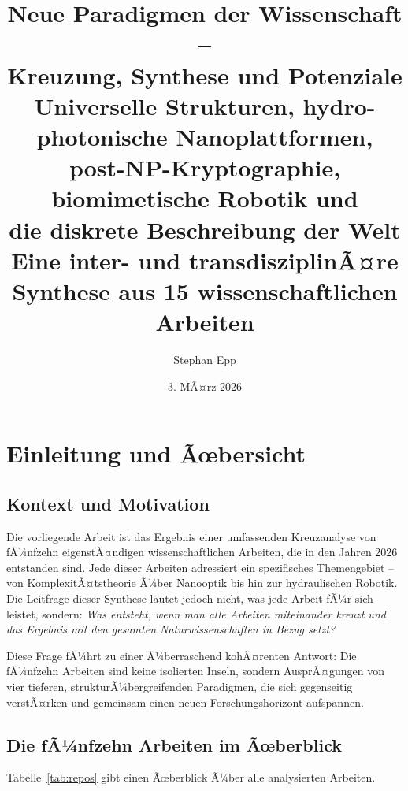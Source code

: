﻿\documentclass[a4paper,12pt]{scrreprt}
\title{%
  \textbf{Neue Paradigmen der Wissenschaft --}\\
  \textbf{Kreuzung, Synthese und Potenziale}\\[0.8em]
  \large Universelle Strukturen, hydro-photonische Nanoplattformen,\\
  post-NP-Kryptographie, biomimetische Robotik und\\
  die diskrete Beschreibung der Welt\\[1em]
  \normalsize Eine inter- und transdisziplinÃ¤re Synthese aus 15 wissenschaftlichen
  Arbeiten
}
\author{Stephan Epp}
\date{3. MÃ¤rz 2026}
\theoremstyle{definition}
\begin{document}
\maketitle
\newpage
\tableofcontents
\newpage

\section{Einleitung und Ãœbersicht}
\label{sec:einleitung}

\subsection{Kontext und Motivation}

Die vorliegende Arbeit ist das Ergebnis einer umfassenden Kreuzanalyse von
fÃ¼nfzehn eigenstÃ¤ndigen wissenschaftlichen Arbeiten, die in den Jahren
2026 entstanden sind. Jede dieser Arbeiten adressiert ein spezifisches
Themengebiet -- von KomplexitÃ¤tstheorie Ã¼ber Nanooptik bis hin zur
hydraulischen Robotik. Die Leitfrage dieser Synthese lautet jedoch nicht,
was jede Arbeit fÃ¼r sich leistet, sondern: \emph{Was entsteht, wenn man
alle Arbeiten miteinander kreuzt und das Ergebnis mit den gesamten
Naturwissenschaften in Bezug setzt?}

Diese Frage fÃ¼hrt zu einer Ã¼berraschend kohÃ¤renten Antwort: Die fÃ¼nfzehn
Arbeiten sind keine isolierten Inseln, sondern AusprÃ¤gungen von vier
tieferen, strukturÃ¼bergreifenden Paradigmen, die sich gegenseitig
verstÃ¤rken und gemeinsam einen neuen Forschungshorizont aufspannen.

\subsection{Die fÃ¼nfzehn Arbeiten im Ãœberblick}

Tabelle~\ref{tab:repos} gibt einen Ãœberblick Ã¼ber alle analysierten Arbeiten.
\end{document}
